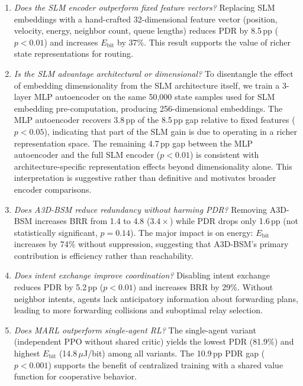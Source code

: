 \documentclass[5p,times]{elsarticle}
\begin{document}
\begin{enumerate}
\item \textit{Does the SLM encoder outperform fixed feature vectors?} Replacing SLM embeddings with a hand-crafted 32-dimensional feature vector (position, velocity, energy, neighbor count, queue lengths) reduces PDR by 8.5\,pp ($p < 0.01$) and increases $E_{\mathrm{bit}}$ by 37\%. This result supports the value of richer state representations for routing.

\item \textit{Is the SLM advantage architectural or dimensional?} To disentangle the effect of embedding dimensionality from the SLM architecture itself, we train a 3-layer MLP autoencoder on the same 50,000 state samples used for SLM embedding pre-computation, producing 256-dimensional embeddings. The MLP autoencoder recovers 3.8\,pp of the 8.5\,pp gap relative to fixed features ($p < 0.05$), indicating that part of the SLM gain is due to operating in a richer representation space. The remaining 4.7\,pp gap between the MLP autoencoder and the full SLM encoder ($p < 0.01$) is consistent with architecture-specific representation effects beyond dimensionality alone. This interpretation is suggestive rather than definitive and motivates broader encoder comparisons.

\item \textit{Does A3D-BSM reduce redundancy without harming PDR?} Removing A3D-BSM increases BRR from 1.4 to 4.8 ($3.4\times$) while PDR drops only 1.6\,pp (not statistically significant, $p = 0.14$). The major impact is on energy: $E_{\mathrm{bit}}$ increases by 74\% without suppression, suggesting that A3D-BSM's primary contribution is efficiency rather than reachability.

\item \textit{Does intent exchange improve coordination?} Disabling intent exchange reduces PDR by 5.2\,pp ($p < 0.01$) and increases BRR by 29\%. Without neighbor intents, agents lack anticipatory information about forwarding plans, leading to more forwarding collisions and suboptimal relay selection.

\item \textit{Does MARL outperform single-agent RL?} The single-agent variant (independent PPO without shared critic) yields the lowest PDR (81.9\%) and highest $E_{\mathrm{bit}}$ (14.8\,$\mu$J/bit) among all variants. The 10.9\,pp PDR gap ($p < 0.001$) supports the benefit of centralized training with a shared value function for cooperative behavior.
\end{enumerate}
\end{document}
